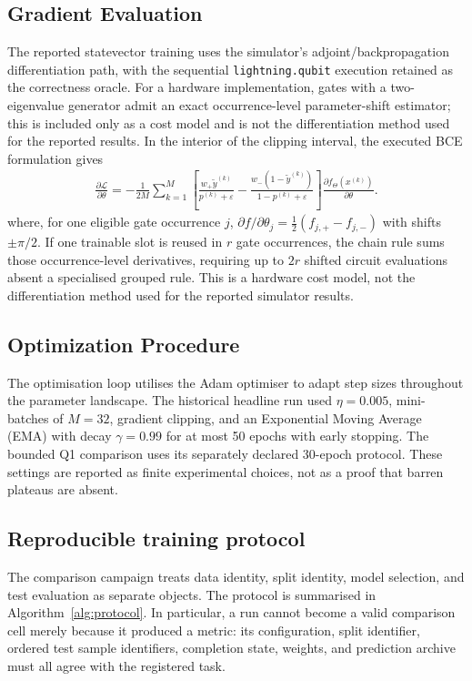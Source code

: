 \documentclass[conference]{IEEEtran}
\begin{document}
\subsection{Gradient Evaluation}
The reported statevector training uses the simulator's adjoint/backpropagation differentiation path, with the sequential \texttt{lightning.qubit} execution retained as the correctness oracle. For a hardware implementation, gates with a two-eigenvalue generator admit an exact occurrence-level parameter-shift estimator; this is included only as a cost model and is not the differentiation method used for the reported results. In the interior of the clipping interval, the executed BCE formulation gives
\begin{align}
\frac{\partial \mathcal{L}}{\partial \theta} = -\frac{1}{2M} \sum_{k=1}^{M}
\left[\frac{w_{+}\tilde{y}^{(k)}}{p^{(k)}+\varepsilon}
-\frac{w_{-}(1-\tilde{y}^{(k)})}{1-p^{(k)}+\varepsilon}\right]
\frac{\partial f_{\Theta}(x^{(k)})}{\partial \theta}.
\end{align}
where, for one eligible gate occurrence $j$, $\partial f/\partial\theta_j = \tfrac{1}{2}(f_{j,+}-f_{j,-})$ with shifts $\pm\pi/2$. If one trainable slot is reused in $r$ gate occurrences, the chain rule sums those occurrence-level derivatives, requiring up to $2r$ shifted circuit evaluations absent a specialised grouped rule. This is a hardware cost model, not the differentiation method used for the reported simulator results.

\subsection{Optimization Procedure}
The optimisation loop utilises the Adam optimiser to adapt step sizes throughout the parameter landscape. The historical headline run used $\eta = 0.005$, mini-batches of $M = 32$, gradient clipping, and an Exponential Moving Average (EMA) with decay $\gamma = 0.99$ for at most 50 epochs with early stopping. The bounded Q1 comparison uses its separately declared 30-epoch protocol. These settings are reported as finite experimental choices, not as a proof that barren plateaus are absent.

\subsection{Reproducible training protocol}
The comparison campaign treats data identity, split identity, model selection,
and test evaluation as separate objects. The protocol is summarised in
Algorithm~\ref{alg:protocol}. In particular, a run cannot become a valid
comparison cell merely because it produced a metric: its configuration, split
identifier, ordered test sample identifiers, completion state, weights, and
prediction archive must all agree with the registered task.
\end{document}
